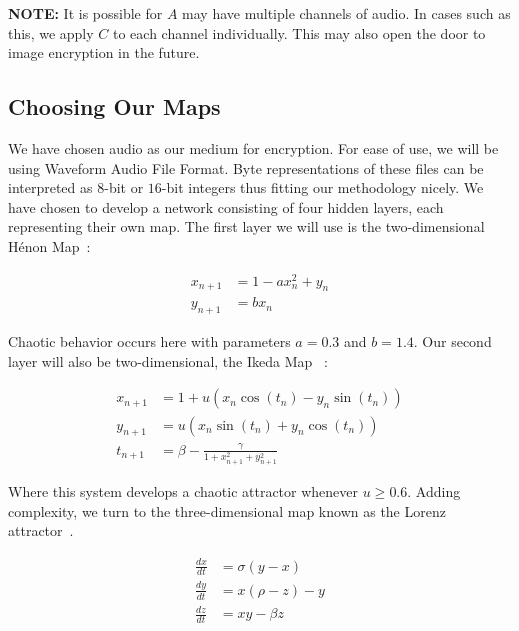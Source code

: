 \documentclass[conference]{IEEEtran}
\begin{document}
\begin{mdframed}
\textbf{NOTE:} It is possible for $A$ may have multiple channels of audio.
In cases such as this, we apply $C$ to each channel individually.
This may also open the door to image encryption in the future.
\end{mdframed}

\subsection{Choosing Our Maps}\label{subsec:choosing-our-maps}

We have chosen audio as our medium for encryption.
For ease of use, we will be using Waveform Audio File Format.
Byte representations of these files can be interpreted as $8$-bit or $16$-bit integers thus fitting our methodology nicely.
We have chosen to develop a network consisting of four hidden layers, each representing their own map.
The first layer we will use is the two-dimensional Hénon Map~\cite{Hamdy}:

\begin{equation}\label{eq:Henon}
\begin{aligned}
    x_{n+1} &= 1 - ax_n^2 + y_n \\
    y_{n+1} &= bx_n
\end{aligned}
\end{equation}

\noindent Chaotic behavior occurs here with parameters $a=0.3$ and $b=1.4$.
Our second layer will also be two-dimensional, the Ikeda Map~\cite{app112110190} :

\begin{equation}\label{eq:Ikeda}
\begin{aligned}
    x_{n+1} &= 1 + u(x_n \cos(t_n) - y_n \sin(t_n))\\
    y_{n+1} &= u(x_n \sin(t_n) + y_n \cos(t_n))\\
    t_{n+1} &= \beta - \frac{\gamma}{1+x_{n+1}^2+y_{n+1}^2}
\end{aligned}
\end{equation}

\noindent Where this system develops a chaotic attractor whenever $u\ge0.6$.
Adding complexity, we turn to the three-dimensional map known as the Lorenz attractor~\cite{Naik2022}.

\begin{equation}\label{eq:Lorenz}
\begin{aligned}
    \frac{dx}{dt} &= \sigma (y - x)\\
    \frac{dy}{dt} &= x (\rho - z) - y\\
    \frac{dz}{dt} &= xy - \beta z
\end{aligned}
\end{equation}
\end{document}
